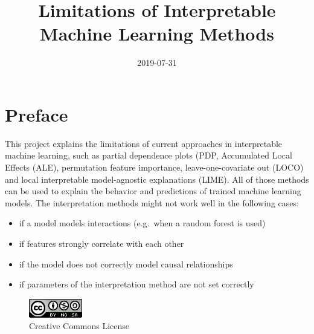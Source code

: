 \documentclass[
]{krantz}
\title{Limitations of Interpretable Machine Learning Methods}
\date{2019-07-31}
\providecommand{\tightlist}{%
  \setlength{\itemsep}{0pt}\setlength{\parskip}{0pt}}
\begin{document}
\maketitle


\thispagestyle{empty}

\begin{center}
\end{center}

\setlength{\abovedisplayskip}{-5pt}
\setlength{\abovedisplayshortskip}{-5pt}

{
\hypersetup{linkcolor=}
\setcounter{tocdepth}{0}
\tableofcontents
}
\listoftables
\listoffigures
\hypertarget{preface}{%
\chapter*{Preface}\label{preface}}


This project explains the limitations of current approaches in interpretable machine learning, such as partial dependence plots (PDP, Accumulated Local Effects (ALE), permutation feature importance, leave-one-covariate out (LOCO) and local interpretable model-agnostic explanations (LIME).
All of those methods can be used to explain the behavior and predictions of trained machine learning models.
The interpretation methods might not work well in the following cases:

\begin{itemize}
\tightlist
\item
  if a model models interactions (e.g.~when a random forest is used)
\item
  if features strongly correlate with each other
\item
  if the model does not correctly model causal relationships
\item
  if parameters of the interpretation method are not set correctly
\end{itemize}

\begin{figure}
\centering
\includegraphics{images/by-nc-sa.png}
\caption{Creative Commons License}
\end{figure}
\end{document}
